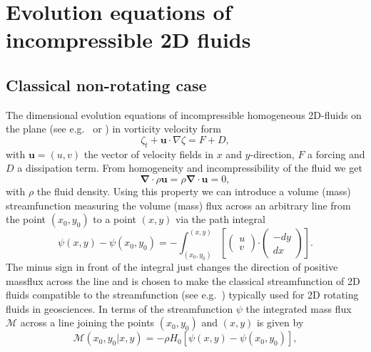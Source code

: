 
\chapter{Evolution equations of incompressible 2D fluids} 
%
%
\section{Classical non-rotating case} 
\label{sec_2Dcase}
%
The dimensional evolution equations of incompressible
homogeneous 2D-fluids on the plane (see e.g.\ \cite{batchelor1967}
or \cite{canutoetal1988}) in vorticity velocity form
\begin{equation} \label{eq_2Dvortvel}
  \zeta_{t} + \mathbf{u} \cdot \nabla \zeta = F + D,
\end{equation}
with $\mathbf{u} = \left( u,v \right)$ the vector of velocity fields 
in $x$ and $y$-direction, $F$ a forcing and $D$ a dissipation term. 
From homogeneity and incompressibility of the fluid we get
\begin{equation} \label{eq_conti}
  \mathbf{\nabla \cdot} \rho \mathbf{u} 
    = 
  \rho \mathbf{\nabla \cdot u} = 0,
\end{equation} 
with $\rho$ the fluid density. Using this property we can introduce 
a volume (mass) streamfunction measuring the volume (mass) flux  
across an arbitrary line from the point $(x_{0},y_{0})$ to a point $(x,y)$ 
via the path integral
\begin{equation} \label{eq_psizetadef}
  \psi(x,y) - \psi(x_{0},y_{0}) = - \int_{(x_{0},y_{0})}^{(x,y)}
  \left[
   \left(
    \begin{array}{c}
     u  
     \\ 
     v
    \end{array}
   \right)
    \mathbf{\cdot}
   \left(
    \begin{array}{c}
     -dy  
      \\ 
      dx 
    \end{array}
   \right)
  \right].
\end{equation}
The minus sign in front of the integral just changes the direction
of positive massflux across the line and is chosen to make 
the classical streamfunction of 2D fluids compatible to 
the streamfunction (see e.g.\ \cite{danilovandgurarie2000}) 
typically used for 2D rotating fluids in geosciences. 
In terms of the streamfunction $\psi$ the integrated mass flux 
$\mathcal{M}$ across a line joining the points $(x_{0},y_{0})$ and 
$(x,y)$ is given by
\begin{equation} \label{eq_calM}
  \mathcal{M}(x_{0},y_{0}|x,y)
   = - \rho H_{0} 
       \left[\psi(x,y) -  \psi(x_{0},y_{0}) \right],
\end{equation}
